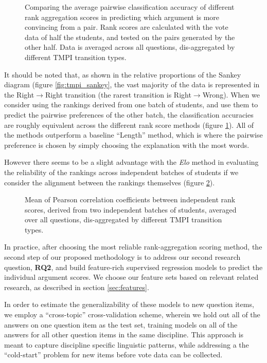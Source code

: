 \documentclass[notitlepage,12pt]{jedm}
\begin{document}
\begin{figure}[H]
	\centering
	\scalebox{0.6}{}
	\caption{
		Comparing the average pairwise classification accuracy of different 
		rank aggregation scores in predicting which argument is more convincing 
		from a pair. 
		Rank scores are calculated with the vote data of half the students, and 
		tested on the pairs generated by the other half. 
		Data is averaged across all questions, dis-aggregated by different TMPI 
		transition types. 
	}
	\label{fig:acc_by_batch}
\end{figure}

It should be noted that, as shown in the relative proportions of the Sankey 
diagram (figure \ref{fig:tmpi_sankey}, the vast majority of the data is 
represented in the Right$\rightarrow$Right transition (the rarest transition is 
Right$\rightarrow$Wrong).
When we consider using the rankings derived from one batch of students, and use 
them to predict the pairwise preferences of the other batch, the classification 
accuracies are roughly equivalent across the different rank score methods 
(figure \ref{fig:acc_by_batch}).
All of the methods outperform a baseline ``Length'' method, which is where the 
pairwise preference is chosen by simply choosing the explanation with the most 
words.

However there seems to be a slight advantage with the \textit{Elo} method in 
evaluating the reliability of the rankings across independent batches of 
students if we consider the alignment between the rankings themselves (figure 
\ref{fig:corr_by_batch}).


\begin{figure}[H]
	\centering
	\scalebox{0.6}{}
	\caption{
		Mean of Pearson correlation coefficients between independent rank 
		scores, derived from two independent batches of students, averaged over 
		all questions, dis-aggregated by different TMPI transition types.
	}
	\label{fig:corr_by_batch}
\end{figure}

In practice, after choosing the most reliable rank-aggregation scoring method, 
the second step of our proposed methodology is to address our second research 
question, \textbf{RQ2}, and build feature-rich supervised regression models to 
predict the individual argument scores.
We choose our feature sets based on relevant related research, as described in 
section \ref{sec:features}. 

In order to estimate the generalizability of these models to new question 
items, we employ a ``cross-topic'' cross-validation scheme, wherein we hold out 
all of the answers on one question item as the test set, training models on all 
of the answers for all other question items in the same discipline.
This approach is meant to capture discipline specific linguistic patterns, 
while addressing a the ``cold-start'' problem for new items before vote data 
can be collected.
\end{document}
